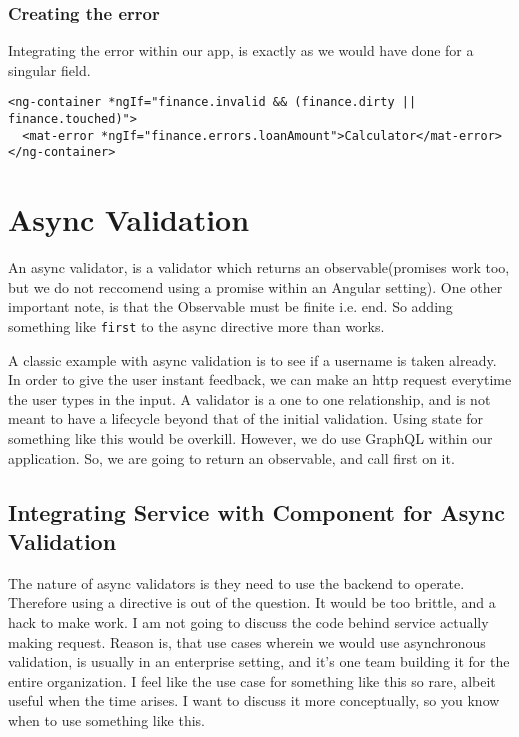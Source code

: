 \subsubsection{Creating the error}

Integrating the error within our app, is exactly as we would have done for a
singular field.

\begin{lstlisting}[caption=finance-calculator.component.html]
<ng-container *ngIf="finance.invalid && (finance.dirty || finance.touched)">
  <mat-error *ngIf="finance.errors.loanAmount">Calculator</mat-error>
</ng-container>
\end{lstlisting}

\section{Async Validation}
An async validator, is a validator which returns an observable(promises work too, but 
we do not reccomend using a promise within an Angular setting). One other important 
note, is that the Observable must be finite i.e. end. So adding something like 
\lstinline{first} to the async directive more than works. 

A classic example with async validation is to see if a username is taken already. 
In order to give the user instant feedback, we can make an http request everytime
the user types in the input. A validator is a one to one relationship, and is not 
meant to have a lifecycle beyond that of the initial validation. Using state for 
something like this would be overkill. However, we do use GraphQL within our 
application. So, we are going to return an observable, and call first on it. 

\subsection{Integrating Service with Component for Async Validation}
The nature of async validators is they need to use the backend to operate. 
Therefore using a directive is out of the question. It would be too brittle,
and a hack to make work. I am not going to discuss the code behind service
actually making request. Reason is, that use cases wherein we would use 
asynchronous validation, is usually in an enterprise setting, and it's one
team building it for the entire organization. I feel like the use case for 
something like this so rare, albeit useful when the time arises. I want to 
discuss it more conceptually, so you know when to use something like this.

